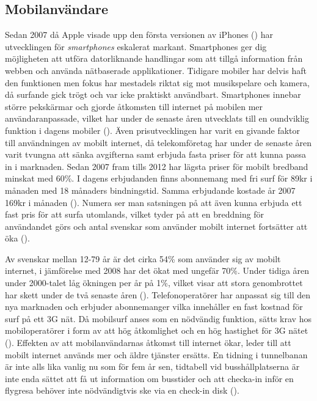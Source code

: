 \documentclass[11pt]{article}
\begin{document}
\subsection{Mobilanvändare}

Sedan 2007 då Apple visade upp den första versionen av iPhones (\cite{AppleRevolution}) har utvecklingen för \textit{smartphones} eskalerat markant. Smartphones ger dig möjligheten att utföra datorliknande handlingar som att tillgå information från webben och använda nätbaserade applikationer. Tidigare mobiler har delvis haft den funktionen men fokus har mestadels riktat sig mot musikspelare och kamera, då surfande gick trögt och var icke praktiskt användbart.
Smartphones innebar större pekskärmar och gjorde åtkomsten till internet på mobilen mer användaranpassade, vilket har under de senaste åren utvecklats till en oundviklig funktion i dagens mobiler (\cite[s. 4]{Cfigroup_2009}).  Även prisutvecklingen har varit en givande faktor till användningen av mobilt internet, då telekomföretag har under de senaste åren varit tvungna att sänka avgifterna samt erbjuda fasta priser för att kunna passa in i marknaden. Sedan 2007 fram tills 2012 har lägsta priser för mobilt bredband minskat med 60\%. I dagens erbjudanden finns abonnemang med fri surf för 89kr i månaden med 18 månaders bindningstid. Samma erbjudande kostade år 2007 169kr i månaden (\cite[s. 36]{pts}). Numera ser man satsningen på att även kunna erbjuda ett fast pris för att surfa utomlands, vilket tyder på att en breddning för användandet görs och antal svenskar som använder mobilt internet fortsätter att öka (\cite{telekomidag}).

Av svenskar mellan 12-79 år är det cirka 54\% som använder sig av mobilt internet, i jämförelse med 2008 har det ökat med ungefär 70\%. Under tidiga åren under 2000-talet låg ökningen per år på 1\%, vilket visar att stora genombrottet har skett under de två senaste åren (\cite[s. 24]{.se}).  Telefonoperatörer har anpassat sig till den nya marknaden och erbjuder abonnemanger vilka innehåller en fast kostnad för surf på ett 3G nät. Då mobilsurf anses som en nödvändig funktion, sätts krav hos mobiloperatörer i form av att hög åtkomlighet och en hög hastighet för 3G nätet (\cite[s. 17]{Cfigroup_2009}). Effekten av att mobilanvändarnas åtkomst till internet ökar, leder till att mobilt internet används mer och äldre tjänster ersätts. En tidning i tunnelbanan är inte alls lika vanlig nu som för fem år sen, tidtabell vid busshållplatserna är inte enda sättet att få ut information om busstider och att checka-in inför en flygresa behöver inte nödvändigtvis ske via en check-in disk (\cite{kpcb}).
\end{document}
